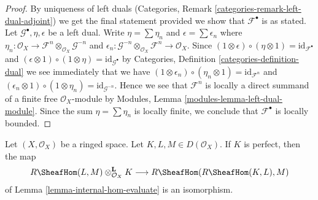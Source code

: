 \begin{proof}
By uniqueness of left duals
(Categories, Remark \ref{categories-remark-left-dual-adjoint})
we get the final statement provided we show that $\mathcal{F}^\bullet$
is as stated. Let $\mathcal{G}^\bullet, \eta, \epsilon$ be a left dual.
Write $\eta = \sum \eta_n$ and $\epsilon = \sum \epsilon_n$
where $\eta_n : \mathcal{O}_X \to
\mathcal{F}^n \otimes_{\mathcal{O}_X} \mathcal{G}^{-n}$
and
$\epsilon_n : \mathcal{G}^{-n} \otimes_{\mathcal{O}_X} \mathcal{F}^n
\to \mathcal{O}_X$. Since
$(1 \otimes \epsilon) \circ (\eta \otimes 1) = \text{id}_{\mathcal{F}^\bullet}$
and
$(\epsilon \otimes 1) \circ (1 \otimes \eta) = \text{id}_{\mathcal{G}^\bullet}$
by Categories, Definition \ref{categories-definition-dual} we see immediately
that we have
$(1 \otimes \epsilon_n) \circ (\eta_n \otimes 1) = \text{id}_{\mathcal{F}^n}$
and
$(\epsilon_n \otimes 1) \circ (1 \otimes \eta_n) =
\text{id}_{\mathcal{G}^{-n}}$.
Hence we see that $\mathcal{F}^n$ is locally a direct summand of a finite
free $\mathcal{O}_X$-module by
Modules, Lemma \ref{modules-lemma-left-dual-module}.
Since the sum $\eta = \sum \eta_n$ is locally finite, we conclude that
$\mathcal{F}^\bullet$ is locally bounded.
\end{proof}

\begin{lemma}
\label{lemma-internal-hom-evaluate-isom}
Let $(X, \mathcal{O}_X)$ be a ringed space. Let $K, L, M \in D(\mathcal{O}_X)$.
If $K$ is perfect, then the map
$$
R\SheafHom(L, M) \otimes_{\mathcal{O}_X}^\mathbf{L} K
\longrightarrow
R\SheafHom(R\SheafHom(K, L), M)
$$
of Lemma \ref{lemma-internal-hom-evaluate} is an isomorphism.
\end{lemma}

